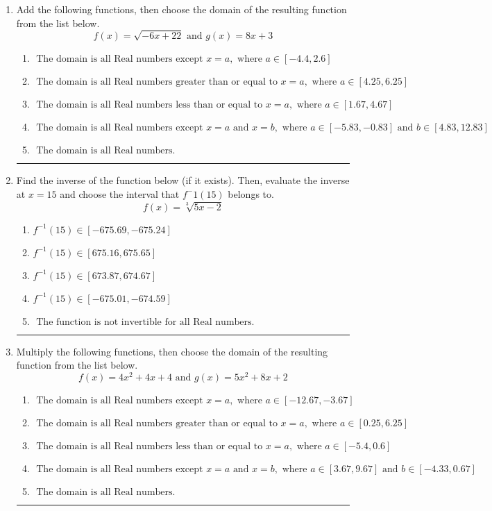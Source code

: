 \documentclass[14pt]{extbook}
\newcommand{\litem}[1]{\item#1\hspace*{-1cm}\rule{\textwidth}{0.4pt}}
\begin{document}
\begin{enumerate}
{\begin{enumerate}[label=\Alph*.]
\end{enumerate} }
\litem{
Add the following functions, then choose the domain of the resulting function from the list below.\[ f(x) = \sqrt{-6x+22}  \text{ and } g(x) = 8x + 3 \]\begin{enumerate}[label=\Alph*.]
\item \( \text{ The domain is all Real numbers except } x = a, \text{ where } a \in [-4.4, 2.6] \)
\item \( \text{ The domain is all Real numbers greater than or equal to } x = a, \text{ where } a \in [4.25, 6.25] \)
\item \( \text{ The domain is all Real numbers less than or equal to } x = a, \text{ where } a \in [1.67, 4.67] \)
\item \( \text{ The domain is all Real numbers except } x = a \text{ and } x = b, \text{ where } a \in [-5.83, -0.83] \text{ and } b \in [4.83, 12.83] \)
\item \( \text{ The domain is all Real numbers. } \)

\end{enumerate} }
\litem{
Find the inverse of the function below (if it exists). Then, evaluate the inverse at $x = 15$ and choose the interval that $f^-1(15)$ belongs to.\[ f(x) = \sqrt[3]{5 x - 2} \]\begin{enumerate}[label=\Alph*.]
\item \( f^{-1}(15) \in [-675.69, -675.24] \)
\item \( f^{-1}(15) \in [675.16, 675.65] \)
\item \( f^{-1}(15) \in [673.87, 674.67] \)
\item \( f^{-1}(15) \in [-675.01, -674.59] \)
\item \( \text{ The function is not invertible for all Real numbers. } \)

\end{enumerate} }
\litem{
Multiply the following functions, then choose the domain of the resulting function from the list below.\[ f(x) = 4x^{2} +4 x + 4 \text{ and } g(x) = 5x^{2} +8 x + 2 \]\begin{enumerate}[label=\Alph*.]
\item \( \text{ The domain is all Real numbers except } x = a, \text{ where } a \in [-12.67, -3.67] \)
\item \( \text{ The domain is all Real numbers greater than or equal to } x = a, \text{ where } a \in [0.25, 6.25] \)
\item \( \text{ The domain is all Real numbers less than or equal to } x = a, \text{ where } a \in [-5.4, 0.6] \)
\item \( \text{ The domain is all Real numbers except } x = a \text{ and } x = b, \text{ where } a \in [3.67, 9.67] \text{ and } b \in [-4.33, 0.67] \)
\item \( \text{ The domain is all Real numbers. } \)


\end{enumerate}}
\end{enumerate}
\end{document}
